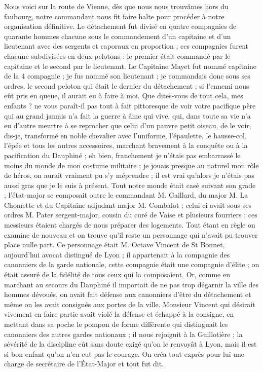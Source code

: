 \documentclass[11pt,a4paper]{report}
\begin{document}
Nous voici sur la route de Vienne, dès que nous nous trouvâmes hors du faubourg, notre commandant nous fit faire halte pour procéder à notre organisation définitive. Le détachement fut divisé en quatre compagnies de quarante hommes chacune sous le commandement d'un capitaine et d'un lieutenant avec des sergents et caporaux en proportion ; ces compagnies furent chacune subdivisées en deux pelotons : le premier était commandé par le capitaine et le second par le lieutenant. Le Capitaine Mayet fut nommé capitaine de la 4 compagnie ; je fus nommé son lieutenant ; je commandais donc sous ses ordres, le second peloton qui était le dernier du détachement ; si l'ennemi nous eût pris en queue, il aurait eu à faire à moi. Que dites-vous de tout cela, mes enfants ? ne vous paraît-il pas tout à fait pittoresque de voir votre pacifique père qui au grand jamais n'a fait la guerre à âme qui vive, qui, dans toute sa vie n'a eu d'autre meurtre à se reprocher que celui d'un pauvre petit oiseau, de le voir, dis-je, transformé en noble chevalier avec l'uniforme, l'épaulette, le hausse-col, l'épée et tous les autres accessoires, marchant bravement à la conquête ou à la pacification du Dauphiné ; eh bien, franchement je n'étais pas embarrassé le moins du monde de mon costume militaire ; je jouais presque au naturel mon rôle de héros, on aurait vraiment pu s'y méprendre ; il est vrai qu'alors je n'étais pas aussi gras que je le suis à présent. Tout notre monde était casé suivant son grade ; l'état-major se composait outre le commandant M. Gaillard, du major M. La Chomette et du Capitaine adjudant major M. Combalot ; celui-ci avait sous ses ordres M. Pater sergent-major, cousin du curé de Vaise et plusieurs fourriers ; ces messieurs étaient chargés de nous préparer des logements. Tout étant en règle on examine de nouveau et on trouve qu'il reste un personnage qui n'avait pu trouver place nulle part. Ce personnage était M. Octave Vincent de St Bonnet, aujourd'hui avocat distingué de Lyon ; il appartenait à la compagnie des canonniers de la garde nationale, cette compagnie était une compagnie d'élite ; on était assuré de la fidélité de tous ceux qui la composaient. Or, comme en marchant au secours du Dauphiné il importait de ne pas trop dégarnir la ville des hommes dévoués, on avait fait défense aux canonniers d'être du détachement et même on les avait consignés aux portes de la ville. Monsieur Vincent qui désirait vivement en faire partie avait violé la défense et échappé à la consigne, en mettant dans sa poche le pompon de forme différente qui distinguait les canonniers des autres gardes nationaux ; il nous rejoignit à la Guillotière ; la sévérité de la discipline eût sans doute exigé qu'on le renvoyât à Lyon, mais il est si bon enfant qu'on n'en eut pas le courage. On créa tout exprès pour lui une charge de secrétaire de l'État-Major et tout fut dit.
\end{document}

